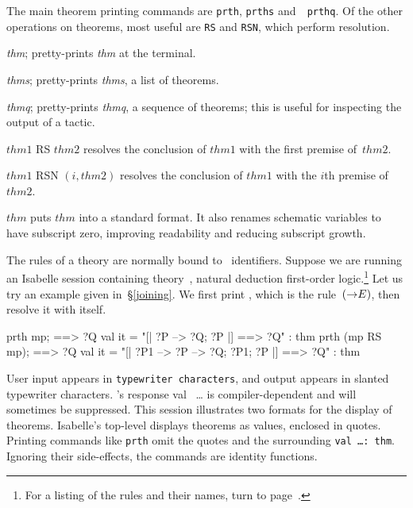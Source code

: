 The main theorem printing commands are {\tt prth}, {\tt prths} and~{\tt
  prthq}.  Of the other operations on theorems, most useful are {\tt RS}
and {\tt RSN}, which perform resolution.

\begin{ttdescription}
\item[\ttindex{prth} {\it thm};]
  pretty-prints {\it thm\/} at the terminal.

\item[\ttindex{prths} {\it thms};]
  pretty-prints {\it thms}, a list of theorems.

\item[\ttindex{prthq} {\it thmq};]
  pretty-prints {\it thmq}, a sequence of theorems; this is useful for
  inspecting the output of a tactic.

\item[$thm1$ RS $thm2$]  
  resolves the conclusion of $thm1$ with the first premise of~$thm2$.

\item[$thm1$ RSN $(i,thm2)$]  
  resolves the conclusion of $thm1$ with the $i$th premise of~$thm2$.

\item[\ttindex{standard} $thm$]  
  puts $thm$ into a standard format.  It also renames schematic variables
  to have subscript zero, improving readability and reducing subscript
  growth.
\end{ttdescription}
The rules of a theory are normally bound to \ML\ identifiers.  Suppose we
are running an Isabelle session containing theory~\FOL, natural deduction
first-order logic.\footnote{For a listing of the \FOL{} rules and their
  \ML{} names, turn to
%
           {page~\pageref{fol-rules}}.}
Let us try an example given in~\S\ref{joining}.  We
first print , which is the rule~$({\rightarrow}E)$, then resolve it with
itself.
\begin{ttbox} 
prth mp; 
{\out [| ?P --> ?Q; ?P |] ==> ?Q}
{\out val it = "[| ?P --> ?Q; ?P |] ==> ?Q" : thm}
prth (mp RS mp);
{\out [| ?P1 --> ?P --> ?Q; ?P1; ?P |] ==> ?Q}
{\out val it = "[| ?P1 --> ?P --> ?Q; ?P1; ?P |] ==> ?Q" : thm}
\end{ttbox}
User input appears in {\footnotesize\tt typewriter characters}, and output
appears in {\sltt slanted typewriter characters}.  \ML's response {\out val
  }~\ldots{} is compiler-dependent and will sometimes be suppressed.  This
session illustrates two formats for the display of theorems.  Isabelle's
top-level displays theorems as \ML{} values, enclosed in quotes.  Printing
commands like {\tt prth} omit the quotes and the surrounding {\tt val
  \ldots :\ thm}.  Ignoring their side-effects, the commands are identity
functions.

